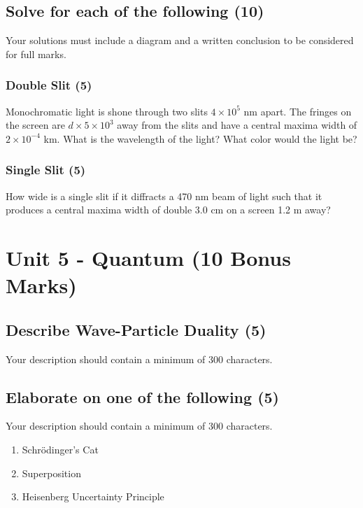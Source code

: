 \documentclass{article}
\begin{document}
\subsection{Solve for each of the following (10)}
Your solutions must include a diagram and a written conclusion to be considered for full marks.

\subsubsection{Double Slit (5)}
Monochromatic light is shone through two slits $4 \times 10^5$ nm apart. The fringes on the screen are $d \times 5 \times 10^3$ away from the slits and have a central maxima width of $2 \times 10^{-4}$ km. What is the wavelength of the light? What color would the light be?

\subsubsection{Single Slit (5)}
How wide is a single slit if it diffracts a 470 nm beam of light such that it produces a central maxima width of double 3.0 cm on a screen 1.2 m away?\\

\section{Unit 5 - Quantum (10 Bonus Marks)}
\subsection{Describe Wave-Particle Duality (5)}
Your description should contain a minimum of 300 characters.

\subsection{Elaborate on one of the following (5)}
Your description should contain a minimum of 300 characters.
\begin{enumerate}[label=\alph*)]
    \item Schrödinger's Cat
    \item Superposition
    \item Heisenberg Uncertainty Principle
\end{enumerate}\leavevmode\\
\end{document}
